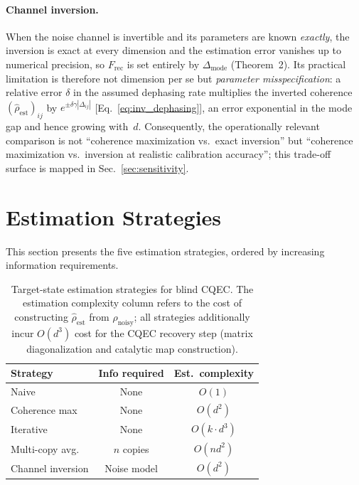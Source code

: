 \documentclass[pra,twocolumn,superscriptaddress,longbibliography,floatfix,nofootinbib]{revtex4-2}
\newcommand{\Frec}{F_\mathrm{rec}}
\newcommand{\rhon}{\rho_\mathrm{noisy}}
\newcommand{\rhoe}{\hat{\rho}_\mathrm{est}}
\begin{document}
\paragraph{Channel inversion.}
When the noise channel is invertible and its parameters are known \emph{exactly}, the inversion is exact at every dimension and the estimation error vanishes up to numerical precision, so $\Frec$ is set entirely by $\Delta_{\mathrm{mode}}$ (Theorem~2).
Its practical limitation is therefore not dimension per se but \emph{parameter misspecification}: a relative error $\delta$ in the assumed dephasing rate multiplies the inverted coherence $(\rhoe)_{ij}$ by $e^{\pm\delta\gamma|\Delta_{ij}|}$ [Eq.~\eqref{eq:inv_dephasing}], an error exponential in the mode gap and hence growing with~$d$.
Consequently, the operationally relevant comparison is not ``coherence maximization vs.\ exact inversion'' but ``coherence maximization vs.\ inversion at realistic calibration accuracy''; this trade-off surface is mapped in Sec.~\ref{sec:sensitivity}.


\section{Estimation Strategies}
\label{sec:strategies}

This section presents the five estimation strategies, ordered by increasing information requirements.

\begin{table}[b]
\caption{Target-state estimation strategies for blind CQEC.
The estimation complexity column refers to the cost of constructing $\rhoe$ from $\rhon$; all strategies additionally incur $O(d^3)$ cost for the CQEC recovery step (matrix diagonalization and catalytic map construction).}
\label{tab:strategies}

\begin{tabular}{lcc}
Strategy & Info required & Est.\ complexity \\
\hline
Naive & None & $O(1)$ \\
Coherence max & None & $O(d^2)$ \\
Iterative & None & $O(k \cdot d^3)$ \\
Multi-copy avg. & $n$ copies & $O(n d^2)$ \\
Channel inversion & Noise model & $O(d^2)$ \\
\end{tabular}

\end{table}
\end{document}
